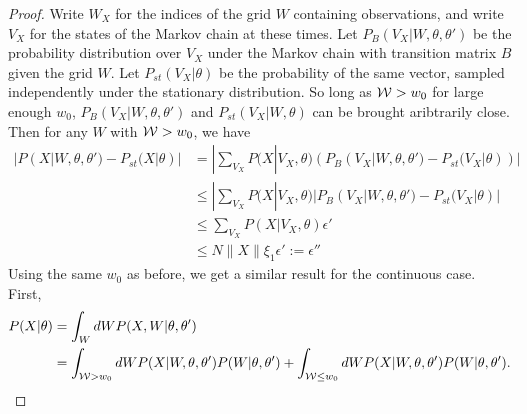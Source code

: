 \begin{proof}
Write $W_X$ for the indices of the grid $W$ containing observations, and write $V_X$
for the states of the Markov chain at these times.
Let $P_B(V_X | W, \theta, \theta')$ be the probability distribution over
$V_X$ under the Markov chain with transition matrix $B$ given the grid $W$.
Let $P_{st}(V_X|\theta)$ be the probability of the same vector, sampled
independently under the stationary distribution. So
long as ${\mathcal W} > w_0$ for large enough $w_0$,
$P_B(V_X | W, \theta, \theta')$ and  $P_{st}(V_X | W, \theta)$ can be
brought aribtrarily close.
Then for any $W$ with ${\mathcal W} > w_0$, we have
\begin{align*}
|P(X|W , \theta, \theta') - P_{st}(X | \theta)| &= | \sum_{V_X} P(X|V_X, \theta)(P_B(V_X | W, \theta, \theta') -  P_{st}(V_X | \theta))|\\
& \leq |\sum_{V_X} P(X | V_X, \theta)|P_B(V_X | W, \theta, \theta') -  P_{st}(V_X | \theta)|\\
& \leq \sum_{V_X} P(X | V_X, \theta){\epsilon'}\\
& \leq N \| X \| \xi_1\epsilon' := \epsilon''
\end{align*}
Using the same $w_0$ as before, we get a similar result for the
continuous case. First,
\begin{align*}
P(X | \theta) &= \int_W dW P(X , W | \theta, \theta')\\
&= \int_{\mW > w_0} dW P(X | W, \theta, \theta') P(W | \theta, \theta') + \int_{\mW \leq w_0}dW P(X | W, \theta, \theta') P(W | \theta, \theta').

\end{align*}
\end{proof}
